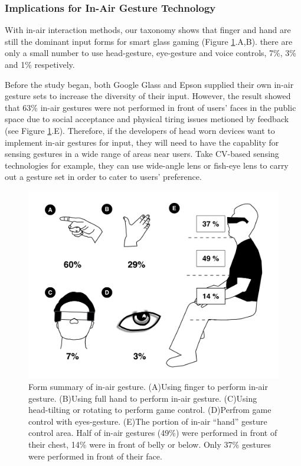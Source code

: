 \documentclass{sigchi}
\begin{document}
    \subsubsection{Implications for In-Air Gesture Technology}
    With in-air interaction methods, our taxonomy shows that finger and hand are still the dominant input forms for smart glass gaming (Figure \ref{fig:figureInAirPorpotion}.{A,B}). there are only a small number to use head-gesture, eye-gesture and voice controls, 7\%, 3\% and 1\% respetively.

    Before the study began, both Google Glass and Epson\cite{GoogleGlass, Colaco:2013:MCL:2501988.2502042} supplied their own in-air gesture sets to increase the diversity of their input. However, the result showed that 63\% in-air gestures were not performed in front of users' faces in the public space due to social acceptance and physical tiring issues metioned by feedback (see Figure \ref{fig:figureInAirPorpotion}.E). Therefore, if the developers of head worn devices want to implement in-air gestures for input, they will need to have the capablity for sensing gestures in a wide range of areas near users. Take CV-based sensing technologies for example, they can use wide-angle lens or fish-eye lens to carry out a gesture set in order to cater to users' preference.   
  \begin{figure}[!h]
  \centering
  \includegraphics[width=1\columnwidth]{InAirControlArea.pdf}
  \caption{Form summary of in-air gesture. (A)Using finger to perform in-air gesture. (B)Using full hand to perform in-air gesture. (C)Using head-tilting or rotating to perform game control. (D)Perfrom game control with eyes-gesture. (E)The portion of in-air ``hand'' gesture control area. Half of in-air gestures (49\%) were performed in front of their chest, 14\% were in front of belly or below. Only 37\% gestures were performed in front of their face.}
  \label{fig:figureInAirPorpotion}
  \end{figure}
\end{document}

